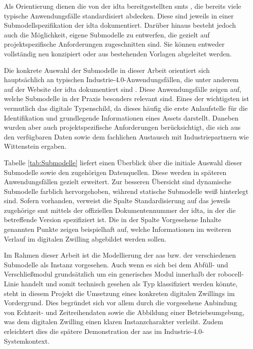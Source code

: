 Als Orientierung dienen die von der \acs{idta} bereitgestellten \acsp{smt} \cite{idtaTemplates}, die bereits viele typische Anwendungsfälle standardisiert abdecken.
Diese sind jeweils in einer Submodellspezifikation der \acs{idta} dokumentiert.
Darüber hinaus besteht jedoch auch die Möglichkeit, eigene Submodelle zu entwerfen, die gezielt auf projektspezifische Anforderungen zugeschnitten sind.
Sie können entweder vollständig neu konzipiert oder aus bestehenden Vorlagen abgeleitet werden.

Die konkrete Auswahl der Submodelle in dieser Arbeit orientiert sich hauptsächlich an typischen Industrie-4.0-Anwendungsfällen, die unter anderem auf der Website der \acs{idta} dokumentiert sind \cite{idtaUseCases}.
Diese Anwendungsfälle zeigen auf, welche Submodelle in der Praxis besonders relevant sind.
Eines der wichtigsten ist vermutlich das digitale Typenschild, da dieses häufig die erste Anlaufstelle für die Identifikation und grundlegende Informationen eines Assets darstellt.
Daneben wurden aber auch projektspezifische Anforderungen berücksichtigt, die sich aus den verfügbaren Daten sowie dem fachlichen Austausch mit Industriepartnern wie Wittenstein ergaben.

Tabelle \ref{tab:Submodelle} liefert einen Überblick über die initiale Auswahl dieser Submodelle sowie den zugehörigen Datenquellen.
Diese werden in späteren Anwendungsfällen gezielt erweitert.
Zur besseren Übersicht sind dynamische Submodelle farblich hervorgehoben, während statische Submodelle weiß hinterlegt sind.
Sofern vorhanden, verweist die Spalte Standardisierung auf das jeweils zugehörige \acs{smt} mittels der offiziellen Dokumentennummer der \acs{idta}, in der die betreffende Version spezifiziert ist.
Die in der Spalte Vorgesehene Inhalte genannten Punkte zeigen beispielhaft auf, welche Informationen im weiteren Verlauf im digitalen Zwilling abgebildet werden sollen.

\vspace{0.25em}


\newpage
Im Rahmen dieser Arbeit ist die Modellierung der \acs{aas} bzw. der verschiedenen Submodelle als Instanz vorgesehen.
Auch wenn es sich bei dem Abfüll- und Verschließmodul grundsätzlich um ein generisches Modul innerhalb der robocell-Linie handelt und somit technisch gesehen als Typ klassifiziert werden könnte, steht in diesem Projekt die Umsetzung eines konkreten digitalen Zwillings im Vordergrund.
Dies begründet sich vor allem durch die vorgesehene Anbindung von Echtzeit- und Zeitreihendaten sowie die Abbildung einer Betriebsumgebung, was dem digitalen Zwilling einen klaren Instanzcharakter verleiht.
Zudem erleichtert dies die spätere Demonstration der \acs{aas} im Industrie-4.0-Systemkontext.

